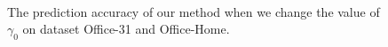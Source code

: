\begin{figure}[htb]
    \centering
    \\
    \caption{
        The prediction accuracy of our method when we change the value of $\gamma_0$ on dataset Office-31 and Office-Home. 
    }
\end{figure}